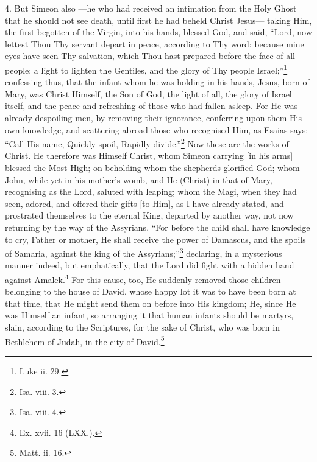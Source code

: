 4. But Simeon also —he who had received an intimation from the Holy Ghost that he should not see death, until first he had beheld Christ Jesus— taking Him, the first-begotten of the Virgin, into his hands, blessed God, and said, “Lord, now lettest Thou Thy servant depart in peace, according to Thy word: because mine eyes have seen Thy salvation, which Thou hast prepared before the face of all people; a light to lighten the Gentiles, and the glory of Thy people Israel;”\footnote{Luke ii. 29.} confessing thus, that the infant whom he was holding in his hands, Jesus, born of Mary, was Christ Himself, the Son of God, the light of all, the glory of Israel itself,  and the peace and refreshing of those who had fallen asleep. For He was already despoiling men, by removing their ignorance, conferring upon them His own knowledge, and scattering abroad those who recognised Him, as Esaias says: “Call His name, Quickly spoil, Rapidly divide.”\footnote{Isa. viii. 3.} Now these are the works of Christ. He therefore was Himself Christ, whom Simeon carrying [in his arms] blessed the Most High; on beholding whom the shepherds glorified God; whom John, while yet in his mother’s womb, and He (Christ) in that of Mary, recognising as the Lord, saluted with leaping; whom the Magi, when they had seen, adored, and offered their gifts [to Him], as I have already stated, and prostrated themselves to the eternal King, departed by another way, not now returning by the way of the Assyrians. “For before the child shall have knowledge to cry, Father or mother, He shall receive the power of Damascus, and the spoils of Samaria, against the king of the Assyrians;”\footnote{Isa. viii. 4.} declaring, in a mysterious manner indeed, but emphatically, that the Lord did fight with a hidden hand against Amalek.\footnote{Ex. xvii. 16 (LXX.).} For this cause, too, He suddenly removed those children belonging to the house of David, whose happy lot it was to have been born at that time, that He might send them on before into His kingdom; He, since He was Himself an infant, so arranging it that human infants should be martyrs, slain, according to the Scriptures, for the sake of Christ, who was born in Bethlehem of Judah, in the city of David.\footnote{Matt. ii. 16.}

